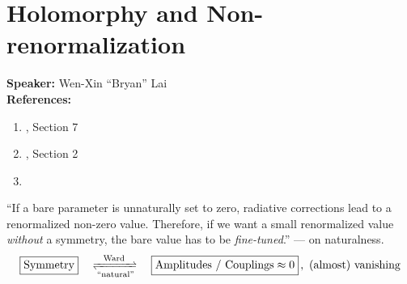 \documentclass[a4paper
	,10pt
]{article}
\newcommand{\speaker}[1]{\noindent\textbf{Speaker:} #1}
\newcommand{\references}[1]{\noindent\textbf{References:} #1}
\begin{document}
\section{Holomorphy and Non-renormalization}
	\speaker{Wen-Xin ``Bryan'' Lai}\\
	\references{
	\begin{enumerate}[noitemsep,topsep=0pt]
	\item \textcite{Argyres:1996abc}, Section 7
	\item \textcite{Intriligator:1995au}, Section 2
	\item \textcite{Seiberg:1993vc}
	\end{enumerate}
	}\vspace{.5\baselineskip}
	
	``If a bare parameter is unnaturally set to zero, radiative corrections lead to a renormalized non-zero value. Therefore, if we want a small renormalized value \textit{without} a symmetry, the bare value has to be \textit{fine-tuned}.'' --- \textcite{Seiberg:1993vc} on naturalness. 
	\begin{equation}
		\boxed{\text{Symmetry}}
		\quad\xrightleftharpoons[
			\text{``natural''}
		]{\text{Ward}}\quad
		\boxed{\text{Amplitudes / Couplings} \approx 0}\,,
		\ \text{(almost) vanishing}
	\end{equation}
\end{document}
